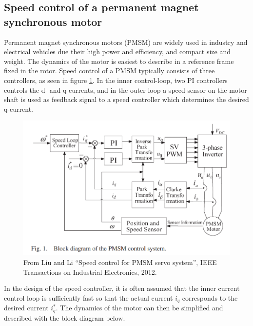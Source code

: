 \documentclass[letterpaper,12pt]{scrartcl}
\begin{document}
\subsection*{Speed control of a permanent magnet synchronous motor}
Permanent magnet synchronous motors (PMSM) are widely used in industry and electrical vehicles due their high power and efficiency, and compact size and weight. The dynamics of the motor is easiest to describe in a reference frame fixed in the rotor. Speed control of a PMSM typically consists of three controllers, as seen in figure \ref{fig:pmsm-block}. In the inner control-loop, two PI controllers controls the d- and q-currents, and in the outer loop a speed sensor on the motor shaft is used as feedback signal to a speed controller which determines the desired q-current. 
\begin{figure}[h]
\begin{center}
  \includegraphics[width=0.7\linewidth]{pmsm_control_block_diag.png}
  \caption{From Liu and Li  ``Speed control for PMSM servo system'', IEEE Transactions on Industrial Electronics, 2012.}
  \label{fig:pmsm-block}
\end{center}
\end{figure}
In the design of the speed controller, it is often assumed that the inner current control loop is sufficiently fast so that the actual current $i_q$ corresponds to the desired current $i_q^*$. The dynamics of the motor can then be simplified and described with the block diagram below. 
\end{document}
